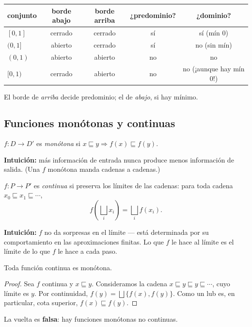 \begin{example}
\begin{center}
\begin{tabular}{lcccc}
\toprule
\rowcolor{accent!12}
\textbf{conjunto} & \textbf{borde abajo} & \textbf{borde arriba} & \textbf{¿predominio?} & \textbf{¿dominio?} \\
\midrule
$[0,1]$ & cerrado & cerrado & sí & sí (mín $0$) \\
$(0,1]$ & abierto & cerrado & sí & no (sin mín) \\
$(0,1)$ & abierto & abierto & no & no \\
$[0,1)$ & cerrado & abierto & no & no (¡aunque hay mín $0$!) \\
\bottomrule
\end{tabular}
\end{center}
El borde de \emph{arriba} decide predominio; el de \emph{abajo}, si hay mínimo.
\end{example}

\subsection*{Funciones monótonas y continuas}
\begin{definition}[Monótona]
$f : D \to D'$ es \emph{monótona} si $x \sqsubseteq y \Rightarrow f(x) \sqsubseteq f(y)$.
\end{definition}
\noindent\textbf{Intuición:} más información de entrada nunca produce menos información
de salida. (Una $f$ monótona manda cadenas a cadenas.)

\begin{definition}[Continua]
$f : P \to P'$ es \emph{continua} si preserva los límites de las cadenas: para toda
cadena $x_0 \sqsubseteq x_1 \sqsubseteq \cdots$,
\[
f\!\left(\bigsqcup_i x_i\right) = \bigsqcup_i f(x_i).
\]
\end{definition}
\noindent\textbf{Intuición:} $f$ no da sorpresas en el límite --- está determinada por
su comportamiento en las aproximaciones finitas. Lo que $f$ le hace al límite es el
límite de lo que $f$ le hace a cada paso.

\begin{proposition}
Toda función continua es monótona.
\end{proposition}
\begin{proof}
Sea $f$ continua y $x \sqsubseteq y$. Consideramos la cadena
$x \sqsubseteq y \sqsubseteq y \sqsubseteq \cdots$, cuyo límite es $y$. Por continuidad,
$f(y) = \bigsqcup\{f(x), f(y)\}$. Como un lub es, en particular, cota superior,
$f(x) \sqsubseteq f(y)$.
\end{proof}
\noindent La vuelta es \textbf{falsa}: hay funciones monótonas no continuas.

